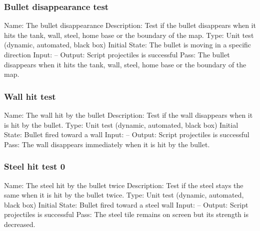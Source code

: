 \documentclass{article}
\begin{document}
\subsubsection{Bullet disappearance test}
Name:  The bullet disappearance \newline
Description: Test if the bullet disappears when it hits the tank, wall, steel,
 home base or the boundary of the map. \newline
Type: Unit test (dynamic, automated, black box) \newline
Initial State:  The bullet is moving in a specific direction\newline
Input: --\newline
Output: Script projectiles is successful  \newline
Pass: The bullet disappears when it hits the tank, wall, steel, home base or 
the boundary of the map. \newline

\subsubsection{Wall hit test}
Name:  The wall hit by the bullet\newline
Description: Test if the wall disappears when it is hit by the bullet. \newline
Type: Unit test (dynamic, automated, black box) \newline
Initial State:  Bullet fired toward a wall \newline
Input: --\newline
Output: Script projectiles is successful  \newline
Pass:  The wall disappears immediately when it is hit by the bullet. \newline

\subsubsection{Steel hit test 0}
Name:  The steel hit by the bullet twice\newline
Description: Test if the steel stays the same when it is hit by the bullet 
twice. \newline
Type: Unit test (dynamic, automated, black box) \newline
Initial State:  Bullet fired toward a steel wall \newline
Input: --\newline
Output: Script projectiles is successful  \newline
Pass:  The steel tile remains on screen but its strength is decreased. \newline
\end{document}
